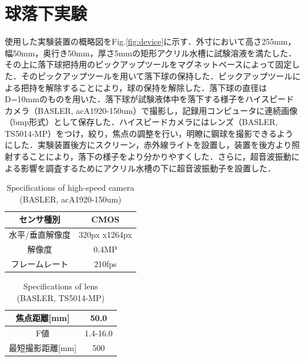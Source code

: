 \section{球落下実験}

使用した実験装置の概略図をFig.\ref{fig:device}に示す．外寸において高さ255mm，幅50mm，奥行き50mm，厚さ5mmの矩形アクリル水槽に試験溶液を満たした．その上に落下球把持用のピックアップツールをマグネットベースによって固定した．そのピックアップツールを用いて落下球の保持した．ピックアップツールによる把持を解除することにより，球の保持を解除した．落下球の直径はD=10mmのものを用いた．落下球が試験液体中を落下する様子をハイスピードカメラ（BASLER, acA1920-150um）で撮影し，記録用コンピュータに連続画像（bmp形式）として保存した．ハイスピードカメラにはレンズ（BASLER, TS5014-MP）をつけ，絞り，焦点の調整を行い，明瞭に鋼球を撮影できるようにした．実験装置後方にスクリーン，赤外線ライトを設置し，装置を後方より照射することにより，落下の様子をより分かりやすくした．さらに，超音波振動による影響を調査するためにアクリル水槽の下に超音波振動子を設置した．

\begin{table}[h]
    \centering
    \caption{Specifications of high-speed camera (BASLER, acA1920-150um)}
    \label{table:camera}
    \begin{tabular}{c|c}\hline
        センサ種別      & CMOS          \\ \hline
        水平/垂直解像度 & 320px x1264px \\ \hline
        解像度          & 0.4MP         \\ \hline
        フレームレート  & 210fps        \\ \hline
    \end{tabular}
\end{table}

\begin{table}[h]
    \centering
    \caption{Specifications of lens (BASLER, TS5014-MP)}
    \label{table:lens}
    \begin{tabular}{c|c}\hline
        焦点距離[mm]     & 50.0     \\ \hline
        F値              & 1.4-16.0 \\ \hline
        最短撮影距離[mm] & 500      \\ \hline
    \end{tabular}
\end{table}

